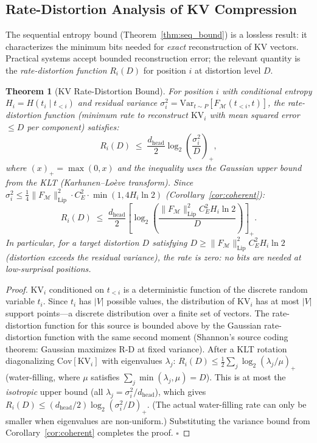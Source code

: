 \documentclass[11pt]{article}
\newtheorem{theorem}{Theorem}
\begin{document}
\subsection{Rate-Distortion Analysis of KV Compression}

The sequential entropy bound (Theorem~\ref{thm:seq_bound}) is a lossless result:
it characterizes the minimum bits needed for \emph{exact} reconstruction of KV
vectors.  Practical systems accept bounded reconstruction error; the relevant
quantity is the \emph{rate-distortion function} $R_i(D)$ for position $i$ at
distortion level $D$.

\begin{theorem}[KV Rate-Distortion Bound]
\label{thm:rate_distortion}
For position $i$ with conditional entropy $H_i = H(t_i \mid t_{<i})$ and residual variance
$\sigma_i^2 = \mathrm{Var}_{t \sim P}[F_{\mathcal{M}}(t_{<i}, t)]$, the
rate-distortion function (minimum rate to reconstruct $\mathrm{KV}_i$ with
mean squared error $\leq D$ per component) satisfies:
\[
  R_i(D) \;\leq\; \frac{d_{\mathrm{head}}}{2} \log_2\!\left(\frac{\sigma_i^2}{D}\right)_+,
\]
where $(x)_+ = \max(0, x)$ and the inequality uses the Gaussian upper bound
from the KLT (Karhunen--Lo\`eve transform).  Since
$\sigma_i^2 \leq \frac{1}{4}\|F_{\mathcal{M}}\|_{\mathrm{Lip}}^2 \cdot C_E^2 \cdot \min(1, 4H_i \ln 2)$
(Corollary~\ref{cor:coherent}):
\[
  R_i(D) \;\leq\; \frac{d_{\mathrm{head}}}{2}
  \left[\log_2\!\left(\frac{\|F_{\mathcal{M}}\|_{\mathrm{Lip}}^2 C_E^2 H_i \ln 2}{D}\right)\right]_+.
\]
In particular, for a target distortion $D$ satisfying
$D \geq \|F_{\mathcal{M}}\|_{\mathrm{Lip}}^2 C_E^2 H_i \ln 2$
(distortion exceeds the residual variance), the rate is zero:
\emph{no bits are needed at low-surprisal positions}.
\end{theorem}

\begin{proof}
$\mathrm{KV}_i$ conditioned on $t_{<i}$ is a deterministic function of the
discrete random variable $t_i$.  Since $t_i$ has $|V|$ possible values, the
distribution of $\mathrm{KV}_i$ has at most $|V|$ support points---a discrete
distribution over a finite set of vectors.  The rate-distortion function for
this source is bounded above by the Gaussian rate-distortion function with
the same second moment (Shannon's source coding theorem: Gaussian maximizes R-D at fixed variance).  After a KLT
rotation diagonalizing $\mathrm{Cov}[\mathrm{KV}_i]$ with eigenvalues $\lambda_j$:
$R_i(D) \leq \frac{1}{2}\sum_j \log_2(\lambda_j / \mu)_+$
(water-filling, where $\mu$ satisfies $\sum_j \min(\lambda_j,\mu) = D$).
This is at most the \emph{isotropic} upper bound (all $\lambda_j = \sigma_i^2/d_{\mathrm{head}}$),
which gives $R_i(D) \leq (d_{\mathrm{head}}/2)\log_2(\sigma_i^2/D)_+$.
(The actual water-filling rate can only be smaller when eigenvalues are non-uniform.)
Substituting the variance bound from Corollary~\ref{cor:coherent} completes
the proof. $\square$
\end{proof}
\end{document}
